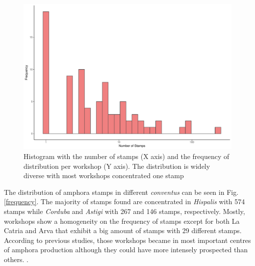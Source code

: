 \documentclass[review]{elsarticle}
\newcommand{\memo}[2]{\textcolor{#1}{#2}}
\newcommand{\xavi}[1]{\memo{magenta}{XRC: #1\\}}
\begin{document}


\begin{figure}[htp]
	\centering
\includegraphics[width=\linewidth]{figs/frequencystamp.pdf}
\caption{Histogram with the number of stamps (X axis) and the frequency of distribution per workshop (Y axis). The distribution is widely diverse with most workshops concentrated one stamp}
\label{stamps}
\end{figure} 


The distribution of amphora stamps in different \textit{conventus} can be seen in Fig. \ref{frequency}. The majority of stamps found are concentrated in \textit{Hispalis} with 574 stamps while \textit{Corduba} and \textit{Astigi} with 267 and 146 stamps, respectively. Mostly, workshops show a homogeneity on the frequency of stamps except for both La Catria and Arva that exhibit a big amount of stamps with 29 different stamps. According to previous studies, those workshops became in most important centres of amphora production although they could have more intensely prospected than others. \citep{arva_1997}.
 
\end{document}
